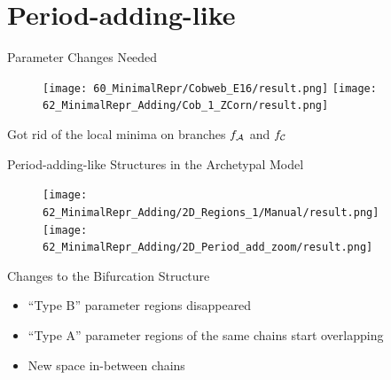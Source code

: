 \section{Period-adding-like}

\begin{frame}{Parameter Changes Needed}
	\vspace{-1em}
	\begin{figure}
		\texttt{[image: 60\_MinimalRepr/Cobweb\_E16/result.png]}
		\quad
		\texttt{[image: 62\_MinimalRepr\_Adding/Cob\_1\_ZCorn/result.png]}
	\end{figure}
	\vspace{1em}
	Got rid of the local minima on branches $f_{\mathcal{A}}$ and $f_{\mathcal{C}}$
\end{frame}

\begin{frame}{Period-adding-like Structures in the Archetypal Model}
	\begin{figure}
		\texttt{[image: 62\_MinimalRepr\_Adding/2D\_Regions\_1/Manual/result.png]}
		\quad
		\texttt{[image: 62\_MinimalRepr\_Adding/2D\_Period\_add\_zoom/result.png]}
	\end{figure}
\end{frame}

\begin{frame}{Changes to the Bifurcation Structure}
	\begin{itemize}
		\item ``Type B'' parameter regions disappeared
		\item ``Type A'' parameter regions of the same chains start overlapping
		      \pause
		\item New space in-between chains
	\end{itemize}
\end{frame}

